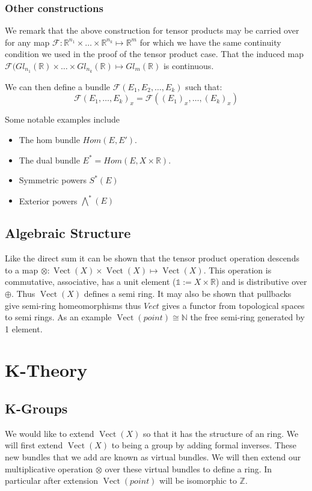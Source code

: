 \documentclass[a4paper,10pt]{article}
\theoremstyle{plain}%
\theoremstyle{definition}
\theoremstyle{remark}
\newcommand{\NN}{\mathbb{N}}
\newcommand{\ZZ}{\mathbb{Z}}
\newcommand{\RR}{\mathbb{R}}
\DeclareMathOperator{\Vect}{Vect}
\begin{document}
\subsubsection{Other constructions}

We remark that the above construction for tensor products may be carried over for any map $\mathcal{F}:\RR^{n_1}\times\ldots\times\RR^{n_k}\mapsto\RR^m$
for which we have the same continuity condition we used in the proof of the tensor product case.
That the induced map $\mathcal{F}(Gl_{n_1}(\RR)\times\ldots\times Gl_{n_k}(\RR)\mapsto Gl_m(\RR)$ is continuous.


We can then define a bundle $\mathcal{F}(E_1,E_2,\ldots,E_k)$ such that:
$$\mathcal{F}(E_1,\ldots,E_k)_x = \mathcal{F}((E_1)_x,\ldots,(E_k)_x)$$

Some notable examples include
\begin{itemize}
 \item The hom bundle $Hom(E,E')$.
 \item The dual bundle $E^\ast = Hom(E,X\times\RR)$.
 \item Symmetric powers $S^\ast(E)$
 \item Exterior powers $\bigwedge^\ast(E)$
\end{itemize}

\subsection{Algebraic Structure}

Like the direct sum it can be shown that the tensor product operation descends to a map 
$\otimes:\Vect(X)\times \Vect(X)\mapsto \Vect(X)$. This operation is commutative, associative, has a unit element
($\mathbb{1}:=X\times\RR$) and is distributive over $\oplus$. Thus $\Vect(X)$ defines a semi ring. It may also be shown that
pullbacks give semi-ring homeomorphisms thus $Vect$ gives a functor from topological spaces to semi rings. As an example $\Vect(point)\cong\NN$ the free semi-ring generated by 1 element.


\section{K-Theory}

\subsection{K-Groups}

We would like to extend $\Vect(X)$ so that it has the structure of an ring. We will first extend $\Vect(X)$ to being a
group by adding formal inverses. These new bundles that we add are known as virtual bundles. We will then extend our multiplicative operation $\otimes$ over these virtual bundles to define a ring. In particular after extension $\Vect(point)$ will be 
isomorphic to $\ZZ$.
\end{document}

